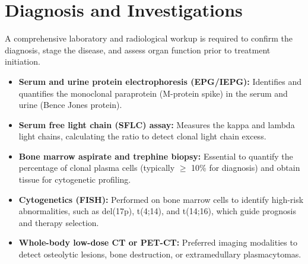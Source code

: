 \section*{Diagnosis and Investigations}
A comprehensive laboratory and radiological workup is required to confirm the diagnosis, stage the disease, and assess organ function prior to treatment initiation.
\begin{itemize}
    \item \textbf{Serum and urine protein electrophoresis (EPG/IEPG):} Identifies and quantifies the monoclonal paraprotein (M-protein spike) in the serum and urine (Bence Jones protein).
    \item \textbf{Serum free light chain (SFLC) assay:} Measures the kappa and lambda light chains, calculating the ratio to detect clonal light chain excess.
    \item \textbf{Bone marrow aspirate and trephine biopsy:} Essential to quantify the percentage of clonal plasma cells (typically $\ge$ 10\% for diagnosis) and obtain tissue for cytogenetic profiling.
    \item \textbf{Cytogenetics (FISH):} Performed on bone marrow cells to identify high-risk abnormalities, such as del(17p), t(4;14), and t(14;16), which guide prognosis and therapy selection.
    \item \textbf{Whole-body low-dose CT or PET-CT:} Preferred imaging modalities to detect osteolytic lesions, bone destruction, or extramedullary plasmacytomas.
\end{itemize}

